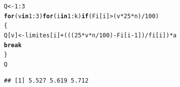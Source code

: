 \documentclass[12pt,letterpaper]{article}\usepackage[]{graphicx}\usepackage[]{color}
\makeatletter
\newcommand{\hlnum}[1]{\textcolor[rgb]{0.686,0.059,0.569}{#1}}%
\newcommand{\hlopt}[1]{\textcolor[rgb]{0,0,0}{#1}}%
\newcommand{\hlstd}[1]{\textcolor[rgb]{0.345,0.345,0.345}{#1}}%
\newcommand{\hlkwa}[1]{\textcolor[rgb]{0.161,0.373,0.58}{\textbf{#1}}}%
\newcommand{\hlkwb}[1]{\textcolor[rgb]{0.69,0.353,0.396}{#1}}%
\newenvironment{kframe}{%
 \def\at@end@of@kframe{}%
 \ifinner\ifhmode%
  \def\at@end@of@kframe{\end{minipage}}%
  \begin{minipage}{\columnwidth}%
 \fi\fi%
 \def\FrameCommand##1{\hskip\@totalleftmargin \hskip-\fboxsep
 \colorbox{shadecolor}{##1}\hskip-\fboxsep
     \hskip-\linewidth \hskip-\@totalleftmargin \hskip\columnwidth}%
 \MakeFramed {\advance\hsize-\width
   \@totalleftmargin\z@ \linewidth\hsize
   \@setminipage}}%
 {\par\unskip\endMakeFramed%
 \at@end@of@kframe}
\newenvironment{knitrout}{}{} %
\makeatother
\begin{document}
\begin{enumerate}
\begin{knitrout}
\begin{kframe}
\begin{alltt}
\hlstd{Q} \hlkwb{<-} \hlnum{1}\hlopt{:}\hlnum{3}
\hlkwa{for}\hlstd{(v} \hlkwa{in} \hlnum{1}\hlopt{:}\hlnum{3}\hlstd{)} \hlkwa{for}\hlstd{(i} \hlkwa{in} \hlnum{1}\hlopt{:}\hlstd{k)} \hlkwa{if} \hlstd{(Fi[i]} \hlopt{>} \hlstd{(v}\hlopt{*}\hlnum{25}\hlopt{*}\hlstd{n)}\hlopt{/}\hlnum{100}\hlstd{)}
\hlstd{\{}
  \hlstd{Q[v]} \hlkwb{<-} \hlstd{limites[i]}\hlopt{+}\hlstd{(((}\hlnum{25}\hlopt{*}\hlstd{v}\hlopt{*}\hlstd{n}\hlopt{/}\hlnum{100}\hlstd{)}\hlopt{-}\hlstd{Fi[i}\hlopt{-}\hlnum{1}\hlstd{])}\hlopt{/}\hlstd{fi[i])}\hlopt{*}\hlstd{a}
  \hlkwa{break}
\hlstd{\}}
\hlstd{Q}
\end{alltt}
\begin{verbatim}
## [1] 5.527 5.619 5.712
\end{verbatim}
\end{kframe}
\end{knitrout}







































\end{enumerate}
\end{document}
